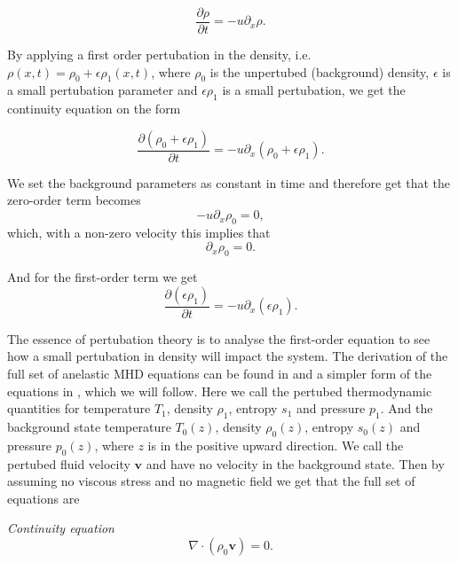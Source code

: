 \documentclass{article}
\begin{document}
\begin{equation*}
    \frac{\partial\rho}{\partial t} = -u\partial_x\rho.
\end{equation*}

By applying a first order pertubation in the density, i.e. $\rho(x,t)=\rho_0 + \epsilon\rho_1(x,t)$, where $\rho_0$ is the unpertubed (background) density, $\epsilon$ is a small pertubation parameter and $\epsilon\rho_1$ is a small pertubation, we get the continuity equation on the form

\begin{equation*}
    \frac{\partial(\rho_0+\epsilon\rho_1)}{\partial t} = -u\partial_x(\rho_0+\epsilon\rho_1).
\end{equation*}

We set the background parameters as constant in time and therefore get that the zero-order term becomes
\begin{equation*}
    -u\partial_x\rho_0 = 0,
\end{equation*}
which, with a non-zero velocity this implies that
\begin{equation*}
    \partial_x\rho_0 = 0.
\end{equation*}

And for the first-order term we get
\begin{equation*}
    \frac{\partial(\epsilon\rho_1)}{\partial t} = -u\partial_x(\epsilon\rho_1).
\end{equation*}

The essence of pertubation theory is to analyse the first-order equation to see how a small pertubation in density will impact the system. The derivation of the full set of anelastic MHD equations can be found in \citep{1999ApJS..121..247L} and a simpler form of the equations in \citep{2021LRSP...18....5F}, which we will follow. Here we call the pertubed thermodynamic quantities for temperature $T_1$, density $\rho_1$, entropy $s_1$ and pressure $p_1$. And the background state temperature $T_0(z)$, density $\rho_0(z)$, entropy $s_0(z)$ and pressure $p_0(z)$, where $z$ is in the positive upward direction. We call the pertubed fluid velocity $\mathbf{v}$ and have no velocity in the background state. Then by assuming no viscous stress and no magnetic field we get that the full set of equations are

\textit{Continuity equation}
\begin{equation}\label{eq:continuity_full}
    \nabla\cdot(\rho_0\mathbf{v})=0.
\end{equation}
\end{document}
